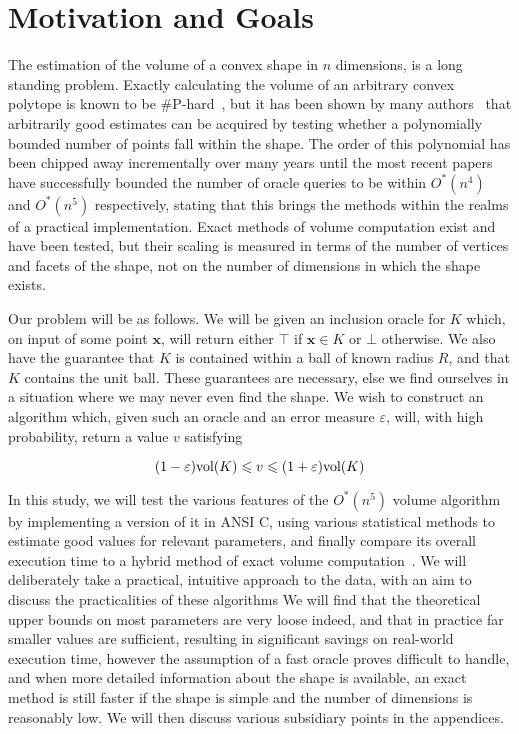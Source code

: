 \section{Motivation and Goals}

The estimation of the volume of a convex shape in $n$ dimensions, is a long standing problem. Exactly calculating the volume of an arbitrary convex polytope is known to be \#P-hard~\cite{Dyer88}, but it has been shown by many authors~\cite{Dyer95, Kannan97, Lovasz03}
that arbitrarily good estimates can be acquired by testing whether a polynomially bounded number of points fall within the shape. The order of this polynomial has been chipped away incrementally over many years until the most recent papers have successfully bounded the number of oracle queries to be within $O^{*}(n^4)$ and $O^{*}(n^5)$ respectively, stating that this brings the methods within the realms of a practical implementation. Exact methods of volume computation exist and have been tested, but their scaling is measured in terms of the number of vertices and facets of the shape, not on the number of dimensions in which the shape exists. 

Our problem will be as follows. We will be given an inclusion oracle for $K$ which, on input of some point $\bm{x}$, will return either $\top$ if $\bm{x} \in K$ or $\bot$ otherwise. We also have the guarantee that $K$ is contained within a ball of known radius $R$, and that $K$ contains the unit ball. These guarantees are necessary, else we find ourselves in a situation where we may never even find the shape. We wish to construct an algorithm which, given such an oracle and an error measure $\varepsilon$, will, with high probability, return a value $v$ satisfying

$$
(1-\varepsilon)\mbox{vol}(K) \leqslant v \leqslant (1+\varepsilon)\mbox{vol}(K)
$$

In this study, we will test the various features of the $O^{*}(n^5)$ volume algorithm~\cite{Kannan97} by implementing a version of it in ANSI C, using various statistical methods to estimate good values for relevant parameters, and finally compare its overall execution time to a hybrid method of exact volume computation~\cite{Bueler98}. We will deliberately take a practical, intuitive approach to the data, with an aim to discuss the practicalities of these algorithms We will find that the theoretical upper bounds on most parameters are very loose indeed, and that in practice far smaller values are sufficient, resulting in significant savings on real-world execution time, however the assumption of a fast oracle proves difficult to handle, and when more detailed information about the shape is available, an exact method is still faster if the shape is simple and the number of dimensions is reasonably low. We will then discuss various subsidiary points in the appendices.

